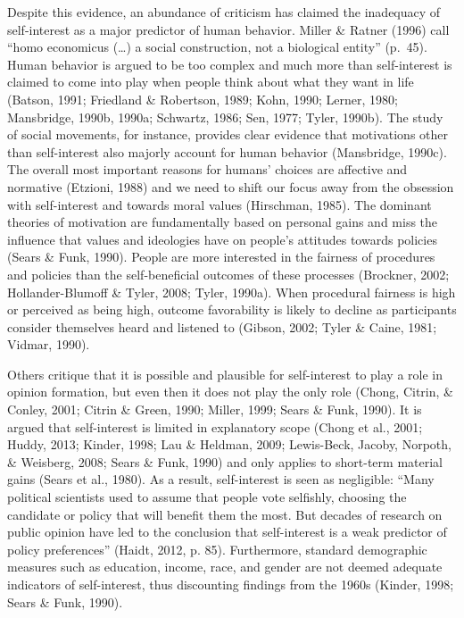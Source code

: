 \documentclass[12pt,econ]{sources/authesis}
\begin{document}
Despite this evidence, an abundance of criticism has claimed the inadequacy of self-interest as a major predictor of human behavior. Miller \& Ratner (1996) call ``homo economicus (\ldots) a social construction, not a biological entity'' (p.~45). Human behavior is argued to be too complex and much more than self-interest is claimed to come into play when people think about what they want in life (Batson, 1991; Friedland \& Robertson, 1989; Kohn, 1990; Lerner, 1980; Mansbridge, 1990b, 1990a; Schwartz, 1986; Sen, 1977; Tyler, 1990b). The study of social movements, for instance, provides clear evidence that motivations other than self-interest also majorly account for human behavior (Mansbridge, 1990c). The overall most important reasons for humans' choices are affective and normative (Etzioni, 1988) and we need to shift our focus away from the obsession with self-interest and towards moral values (Hirschman, 1985). The dominant theories of motivation are fundamentally based on personal gains and miss the influence that values and ideologies have on people's attitudes towards policies (Sears \& Funk, 1990). People are more interested in the fairness of procedures and policies than the self-beneficial outcomes of these processes (Brockner, 2002; Hollander-Blumoff \& Tyler, 2008; Tyler, 1990a). When procedural fairness is high or perceived as being high, outcome favorability is likely to decline as participants consider themselves heard and listened to (Gibson, 2002; Tyler \& Caine, 1981; Vidmar, 1990).

Others critique that it is possible and plausible for self-interest to play a role in opinion formation, but even then it does not play the only role (Chong, Citrin, \& Conley, 2001; Citrin \& Green, 1990; Miller, 1999; Sears \& Funk, 1990). It is argued that self-interest is limited in explanatory scope (Chong et al., 2001; Huddy, 2013; Kinder, 1998; Lau \& Heldman, 2009; Lewis-Beck, Jacoby, Norpoth, \& Weisberg, 2008; Sears \& Funk, 1990) and only applies to short-term material gains (Sears et al., 1980). As a result, self-interest is seen as negligible: ``Many political scientists used to assume that people vote selfishly, choosing the candidate or policy that will benefit them the most. But decades of research on public opinion have led to the conclusion that self-interest is a weak predictor of policy preferences'' (Haidt, 2012, p. 85). Furthermore, standard demographic measures such as education, income, race, and gender are not deemed adequate indicators of self-interest, thus discounting findings from the 1960s (Kinder, 1998; Sears \& Funk, 1990).
\end{document}
